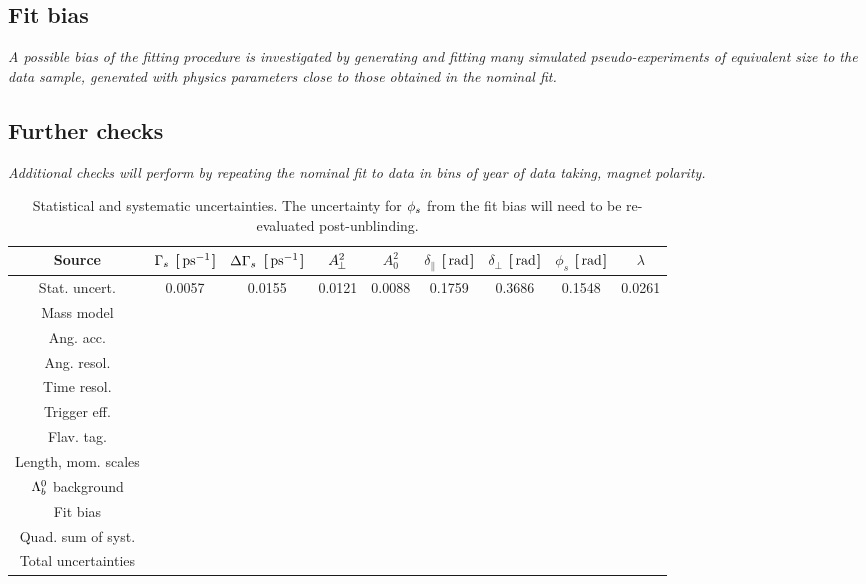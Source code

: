 \subsection{Fit bias}

{\it A possible bias of the fitting procedure is investigated by generating and fitting many simulated pseudo-experiments of equivalent size to the data sample, generated with physics parameters close to those obtained in the nominal fit.}

\subsection{Further checks}

{\it Additional checks will perform by repeating the nominal fit to data in bins of year of data taking, magnet polarity.}

 
\begin{table}[htb]
  \caption{
   Statistical and systematic uncertainties. The uncertainty for ${\phi_{{s}}}$ from the fit bias will need to be re-evaluated post-unblinding.
}
    \small{
\begin{center}
\begin{adjustwidth}{-1.5cm}{}
\begin{tabular}{ccccccccc}
Source &${\Gamma_{{s}}}$ [${\mathrm{ \,ps}}^{-1}$]&${\Delta\Gamma_{{s}}}$ [${\mathrm{ \,ps}}^{-1}$]&$A_{\hspace{-1pt}\perp}^{2}$&$A_0^2$&$\delta_\parallel$ [$\mathrm{ \,rad}$]&$\delta_\perp$ [$\mathrm{ \,rad}$]&$\phi_s$ [$\mathrm{ \,rad}$]&$\lambda$\\ 		\hline
 Stat. uncert.       &  0.0057    & 0.0155&0.0121&0.0088&0.1759&0.3686&0.1548&0.0261                \\
 \hline
 Mass model      &         &&&&&&&               \\
 Ang. acc.&      &&&&&&&                \\
 Ang. resol.&      &&&&&&&                \\
 Time resol.&      &&&&&&&                \\
 Trigger eff. &      &&&&&&&                \\
 Flav. tag. &  &&&&&&&                \\
 Length, mom. scales&      &&&&&&&                \\
 ${{\Lambda}^0_{b}}$ background&      &&&&&&&                \\
 Fit bias&      &&&&&&&                \\
 \hline
 Quad. sum of syst.&      &&&&&&&                \\
 Total uncertainties&      &&&&&&&                \\
 \hline
\end{tabular}
\end{adjustwidth}
\end{center}
  }
\label{tab:StatError}
\end{table}

